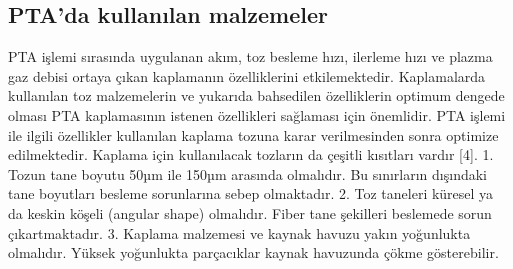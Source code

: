 \subsection{PTA’da kullanılan malzemeler}
PTA işlemi sırasında uygulanan akım, toz besleme hızı, ilerleme hızı ve plazma gaz debisi ortaya çıkan kaplamanın özelliklerini etkilemektedir. Kaplamalarda kullanılan toz malzemelerin ve yukarıda bahsedilen özelliklerin optimum dengede olması PTA kaplamasının istenen özellikleri sağlaması için önemlidir. PTA işlemi ile ilgili özellikler kullanılan kaplama tozuna karar verilmesinden sonra optimize edilmektedir. Kaplama için kullanılacak tozların da çeşitli kısıtları vardır [4]. 
1. Tozun tane boyutu 50µm ile 150µm arasında olmalıdır. Bu sınırların dışındaki tane boyutları besleme sorunlarına sebep olmaktadır. 
2. Toz taneleri küresel ya da keskin köşeli (angular shape) olmalıdır. Fiber tane şekilleri beslemede sorun çıkartmaktadır.
3. Kaplama malzemesi ve kaynak havuzu yakın yoğunlukta olmalıdır. Yüksek yoğunlukta parçacıklar kaynak havuzunda çökme gösterebilir.
